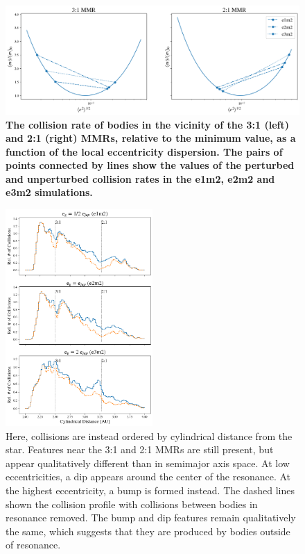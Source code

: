 \documentclass[fleqn,usenatbib]{mnras}
\begin{document}
\begin{figure}
\begin{center}
    \includegraphics[width=\textwidth]{figures/gf_plot.png}
    \caption{\textbf{The collision rate of bodies in the vicinity of the 3:1 (left) and 2:1 (right) MMRs, relative to the minimum value, as a function of the local eccentricity dispersion. The pairs of points connected by lines show the values of the perturbed and unperturbed collision rates in the e1m2, e2m2 and e3m2 simulations.}\label{fig:gf}}
\end{center}
\end{figure}

\begin{figure}
\begin{center}
    \includegraphics[width=0.5\textwidth]{figures/coll_hist_r.png}
    \caption{Here, collisions are instead ordered by cylindrical distance from the star. Features near the 3:1 and 2:1 MMRs are still present, but appear qualitatively different than in semimajor axis space. At low eccentricities, a dip appears around the center of the resonance. At the highest eccentricity, a bump is formed instead. The dashed lines shown the collision profile with collisions between bodies in resonance removed. The bump and dip features remain qualitatively the same, which suggests that they are produced by bodies outside of resonance.\label{fig:coll_hist_r}}
\end{center}
\end{figure}
\end{document}
